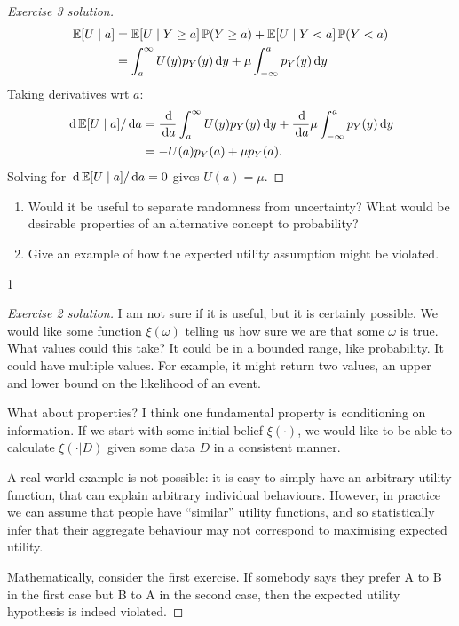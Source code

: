 \documentclass[twoside,a4paper]{article}
\def \solution {1}
\begin{document}
\begin{proof}[Exercise 3 solution]
\begin{align*}
    \mathop{\mbox{\ensuremath{\mathbb{E}}}}\nolimits[U \mid a]
    &=
      \mathop{\mbox{\ensuremath{\mathbb{E}}}}\nolimits[U \mid Y \geq a] \mathop{\mbox{\ensuremath{\mathbb{P}}}}\nolimits(Y \geq a)
      +
      \mathop{\mbox{\ensuremath{\mathbb{E}}}}\nolimits[U \mid Y < a] \mathop{\mbox{\ensuremath{\mathbb{P}}}}\nolimits(Y < a)
    \\
    &=
      \int_{a}^\infty U(y) p_Y(y) \, \mathrm{d} y
      +
      \mu \int_{-\infty}^a p_Y(y) \, \mathrm{d} y
  \end{align*}
  Taking derivatives wrt $a$:
  \begin{align*} 
    \, \mathrm{d} \mathop{\mbox{\ensuremath{\mathbb{E}}}}\nolimits[U \mid a]/\, \mathrm{d} a
    &=
      \frac{\, \mathrm{d}}{\, \mathrm{d} a} \int_{a}^\infty U(y) p_Y(y) \, \mathrm{d} y
      +
      \frac{\, \mathrm{d}}{\, \mathrm{d} a} \mu \int_{-\infty}^a p_Y(y) \, \mathrm{d} y
    \\
    &=
      - U(a) p_Y(a) 
      +
      \mu p_Y(a).
  \end{align*}
  Solving for $\, \mathrm{d} \mathop{\mbox{\ensuremath{\mathbb{E}}}}\nolimits[U \mid a]/\, \mathrm{d} a=0$ gives $U(a) = \mu$.
\end{proof}
\fi
\begin{exercise}
  \begin{enumerate}
    \item Would it be useful to separate randomness from uncertainty? What would be desirable properties of an alternative concept to probability?
  \item Give an example of how the expected utility assumption might be violated.
  \end{enumerate}
\end{exercise}
\if\solution 1
\begin{proof}[Exercise 2 solution]
  I am not sure if it is useful, but it is certainly possible. We would like some function $\xi(\omega)$ telling us how sure we are that some $\omega$ is true. What values could this take? It could be in a bounded range, like probability. It could have multiple values. For example, it might return two values, an upper and lower bound on the likelihood of an event.


  What about properties? I think one fundamental property is conditioning on information. If we start with some initial belief $\xi(\cdot)$, we would like to be able to calculate $\xi(\cdot | D)$ given some data $D$ in a consistent manner.

  A real-world example is not possible: it is easy to simply have an arbitrary utility function, that can explain arbitrary individual behaviours. However, in practice we can assume that people have ``similar'' utility functions, and so statistically infer that their aggregate behaviour may not correspond to maximising expected utility.

  Mathematically, consider the first exercise. If somebody says they prefer A to B in the first case but B to A in the second case, then the expected utility hypothesis is indeed violated.
\end{proof}
\fi
\end{document}
